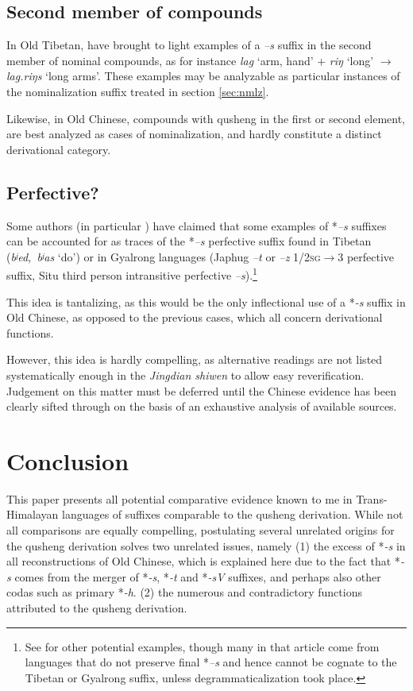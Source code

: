 \documentclass[oneside,a4paper,11pt]{article}
\newcommand{\ipa}[1]{{\phon\textit{\mbox{#1}}}}
\begin{document}
\subsection{Second member of compounds}
In Old Tibetan, \citet{uebach08rjeblas} have brought to light examples of a \ipa{--s} suffix in the second member of nominal compounds, as for instance \ipa{lag} `arm, hand' + \ipa{riŋ} `long' $\rightarrow$ \ipa{lag.riŋs} `long arms'. These examples may be analyzable as particular instances of the nominalization suffix treated in section \ref{sec:nmlz}.

Likewise, in Old Chinese, compounds with qusheng in the first or second element, are best analyzed as cases of nominalization, and hardly constitute a distinct derivational category.
 
\subsection{Perfective?} \label{sec:perf}
Some authors (in particular \citealt{jinlx06}) have claimed that some examples of *\ipa{--s} suffixes can be accounted for as traces of the *\ipa{--s} perfective suffix found in Tibetan (\ipa{bʲed, bʲas} `do') or in Gyalrong languages (Japhug \ipa{--t} or \ipa{--z} \textsc{1/2sg}$\rightarrow$3 perfective suffix, Situ third person intransitive perfective \ipa{--s}).\footnote{See \citet{huangbf97s.houzhui} for other potential examples, though many in that article come from languages that do not preserve final *\ipa{--s} and hence cannot be cognate to the Tibetan or Gyalrong suffix, unless degrammaticalization took place.}

This idea is tantalizing, as this would be the only inflectional use of a *\ipa{-s} suffix in Old Chinese, as opposed to the previous cases, which all concern derivational functions.

However, this idea is hardly compelling, as alternative readings are not listed systematically enough in the \textit{Jingdian shiwen} to allow easy reverification. Judgement on this matter must be deferred until the Chinese evidence has been clearly sifted through on the basis of an exhaustive analysis of available sources.

\section{Conclusion}
This paper presents all potential comparative evidence known to me in Trans-Himalayan languages of suffixes comparable to the qusheng derivation. While not all comparisons are equally compelling, postulating several unrelated origins for the qusheng derivation solves two unrelated issues, namely (1) the excess of *\ipa{-s} in all reconstructions of Old Chinese, which is explained here due to the fact that *\ipa{-s} comes from the merger of *\ipa{-s}, *\ipa{-t} and *\ipa{-sV} suffixes, and perhaps also other codas such as primary *\ipa{-h}. (2) the numerous and contradictory functions attributed to the qusheng derivation.
\end{document}

